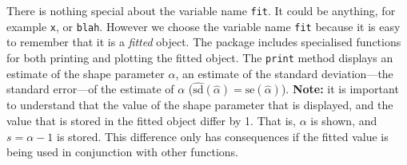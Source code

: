 \documentclass{article}\usepackage[]{graphicx}\usepackage[]{xcolor}
\newcommand{\rcode}[1]{\lstinline[language=R,basicstyle=\normalsize\ttfamily]!#1!}
\begin{document}
There is nothing special about the variable name \rcode{fit}. It could be anything, for example \rcode{x}, or \rcode{blah}. However we choose the variable name \rcode{fit} because it is easy to remember that it is a \emph{fitted} object. The package includes specialised functions for both printing and plotting the fitted object. The \rcode{print} method displays an estimate of the shape parameter $\alpha$, an estimate of the standard deviation---the standard error---of the estimate of $\alpha$ ($\widehat{\mathrm{sd}}(\hat{\alpha})=\mathrm{se}(\hat{\alpha})$). \textbf{Note:} it is important to understand that the value of the shape parameter that is displayed, and the value that is stored in the fitted object differ by 1. That is, $\alpha$ is shown, and $s = \alpha - 1$ is stored. This difference only has consequences if the fitted value is being used in conjunction with other functions.
\end{document}
